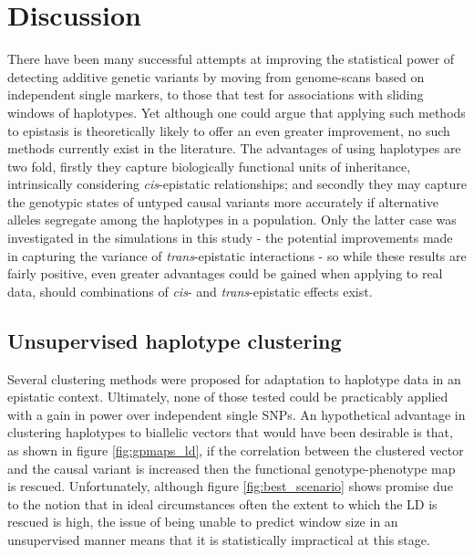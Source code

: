 \section{Discussion}


There have been many successful attempts at improving the statistical power of detecting additive genetic variants by moving from genome-scans based on independent single markers, to those that test for associations with sliding windows of haplotypes. Yet although one could argue that applying such methods to epistasis is theoretically likely to offer an even greater improvement, no such methods currently exist in the literature. The advantages of using haplotypes are two fold, firstly they capture biologically functional units of inheritance, intrinsically considering \emph{cis}-epistatic relationships; and secondly they may capture the genotypic states of untyped causal variants more accurately if alternative alleles segregate among the haplotypes in a population. Only the latter case was investigated in the simulations in this study - the potential improvements made in capturing the variance of \emph{trans}-epistatic interactions - so while these results are fairly positive, even greater advantages could be gained when applying to real data, should combinations of \emph{cis}- and \emph{trans}-epistatic effects exist. 


\subsection{Unsupervised haplotype clustering}

Several clustering methods were proposed for adaptation to haplotype data in an epistatic context. Ultimately, none of those tested could be practicably applied with a gain in power over independent single SNPs. An hypothetical advantage in clustering haplotypes to biallelic vectors that would have been desirable is that, as shown in figure \ref{fig:gpmaps_ld}, if the correlation between the clustered vector and the causal variant is increased then the functional genotype-phenotype map is rescued. Unfortunately, although figure \ref{fig:best_scenario} shows promise due to the notion that in ideal circumstances often the extent to which the LD is rescued is high, the issue of being unable to predict window size in an unsupervised manner means that it is statistically impractical at this stage.

